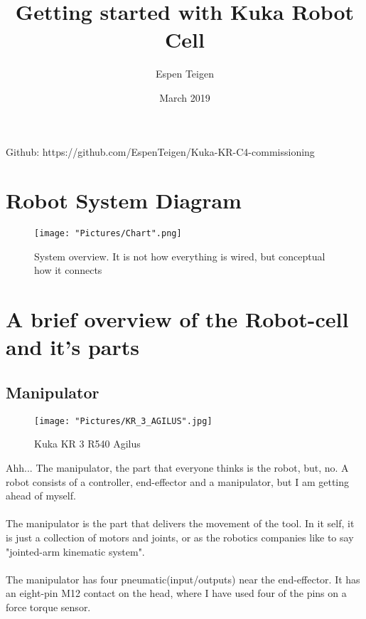 \documentclass{article}
\title{Getting started with Kuka Robot Cell}
\author{Espen Teigen }
\date{March 2019}
\begin{document}
\maketitle

    Github: https://github.com/EspenTeigen/Kuka-KR-C4-commissioning

\newpage
\tableofcontents{}
\newpage


\section{Robot System Diagram}
    \begin{figure}[!h]
        \centering
        \texttt{[image: "Pictures/Chart".png]}
        \caption{System overview. It is not how everything is wired, but conceptual how it connects}
    \end{figure}

\newpage
\section{A brief overview of the Robot-cell and it's parts}
    \subsection{Manipulator}
    
     \begin{figure}[!h]
        \centering
        \texttt{[image: "Pictures/KR\_3\_AGILUS".jpg]}
        \caption{Kuka KR 3 R540 Agilus}
    \end{figure}
    
    
    Ahh... The manipulator, the part that everyone thinks is the robot, but, no. A robot consists of a controller, end-effector and a manipulator, but I am getting ahead of myself.
    \\\\
    The manipulator is the part that delivers the movement of the tool. In it self, it is just a collection of motors and joints, or as the robotics companies like to say "jointed-arm kinematic system". 
    \\\\
    The manipulator has four pneumatic(input/outputs) near the end-effector. It has an eight-pin M12 contact on the head, where I have used four of the pins on a force torque sensor.  
    
\end{document}
